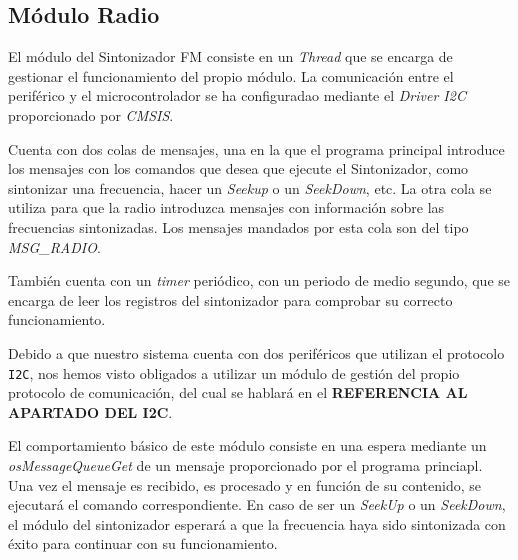 \subsection{Módulo Radio}
El módulo del Sintonizador FM consiste en un \textit{Thread} que se encarga de gestionar el funcionamiento del propio módulo. La comunicación entre el periférico y el microcontrolador se ha configuradao mediante el \textit{Driver I2C} proporcionado por \textit{CMSIS}.

Cuenta con dos colas de mensajes, una en la que el programa principal introduce los mensajes con los comandos que desea que ejecute el Sintonizador, como sintonizar una frecuencia, hacer un \textit{Seekup} o un \textit{SeekDown}, etc. La otra cola se utiliza para que la radio introduzca mensajes con información sobre las frecuencias sintonizadas. Los mensajes mandados por esta cola son del tipo \textit{MSG\_RADIO}.

También cuenta con un \textit{timer} periódico, con un periodo de medio segundo, que se encarga de leer los registros del sintonizador para comprobar su correcto funcionamiento.

Debido a que nuestro sistema cuenta con dos periféricos que utilizan el protocolo \texttt{I2C}, nos hemos visto obligados a utilizar un módulo de gestión del propio protocolo de comunicación, del cual se hablará en el \textbf{REFERENCIA AL APARTADO DEL I2C}.

El comportamiento básico de este módulo consiste en una espera mediante un \textit{osMessageQueueGet} de un mensaje proporcionado por el programa princiapl. Una vez el mensaje es recibido, es procesado y en función de su contenido, se ejecutará el comando correspondiente. En caso de ser un \textit{SeekUp} o un \textit{SeekDown}, el módulo del sintonizador esperará a que la frecuencia haya sido sintonizada con éxito para continuar con su funcionamiento.